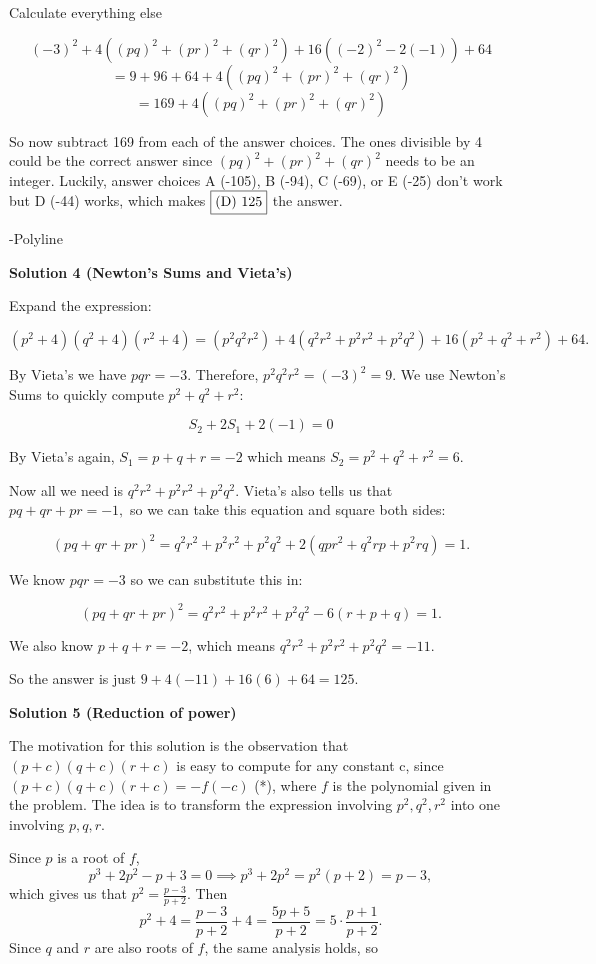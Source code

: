\begin{enumerate}
 Calculate everything else

 
 \[(-3)^2+4((pq)^2+(pr)^2+(qr)^2)+16((-2)^2-2(-1))+64\]
 \[=9+96+64+4((pq)^2+(pr)^2+(qr)^2)\]
 \[=169+4((pq)^2+(pr)^2+(qr)^2)\]

 So now subtract 169 from each of the answer choices. The ones divisible by 4 could be the correct answer since $(pq)^2+(pr)^2+(qr)^2$ needs to be an integer. Luckily, answer choices A (-105), B (-94), C (-69), or E (-25) don't work but D (-44) works, which makes $\fbox{(D) 125}$ the answer.

 -Polyline

 



\textbf{Solution 4 (Newton's Sums and Vieta's)}

Expand the expression: 

 
 \[(p^2 + 4)(q^2 + 4)(r^2 + 4) = (p^2q^2r^2) + 4(q^2r^2 + p^2r^2 + p^2q^2) + 16(p^2 + q^2 + r^2) + 64.\] 

 By Vieta's we have $pqr = -3.$ Therefore, $p^2q^2r^2 = (-3)^2 = 9$. We use Newton's Sums to quickly compute $p^2 + q^2 + r^2:$

 \[S_2 + 2S_1 + 2(-1) = 0\]

 By Vieta's again, $S_1 = p + q + r = -2$ which means $S_2 = p^2 + q^2 + r^2 = 6.$ 

 Now all we need is $q^2r^2 + p^2r^2 + p^2q^2.$ Vieta's also tells us that $pq + qr + pr = -1,$ so we can take this equation and square both sides: 

 
 \[(pq + qr + pr)^2 = q^2r^2 + p^2r^2 + p^2q^2 + 2(qpr^2 + q^2rp + p^2rq) = 1.\] 

 We know $pqr = -3$ so we can substitute this in: 

 
 \[(pq + qr + pr)^2 = q^2r^2 + p^2r^2 + p^2q^2 -6(r + p + q) = 1.\] 

 We also know $p + q + r = -2$, which means $q^2r^2 + p^2r^2 + p^2q^2 = -11.$ 

 
So the answer is just $9 + 4(-11) + 16(6) + 64 = \boxed{125}.$




\textbf{Solution 5 (Reduction of power)}

The motivation for this solution is the observation that $(p+c)(q+c)(r+c)$ is easy to compute for any constant c, since $(p+c)(q+c)(r+c)=-f(-c)$ (*), where $f$ is the polynomial given in the problem. The idea is to transform the expression involving $p^2, q^2, r^2$ into one involving $p, q, r$.

 Since $p$ is a root of $f$, 
 \[p^3+2p^2-p+3=0\implies p^3+2p^2=p^2(p+2)=p-3,\]which gives us that $p^2=\frac{p-3}{p+2}$. Then
 \[p^2+4=\frac{p-3}{p+2} + 4 = \frac{5p+5}{p+2}=5\cdot \frac{p+1}{p+2}.\]Since $q$ and $r$ are also roots of $f$, the same analysis holds, so


\end{enumerate}
